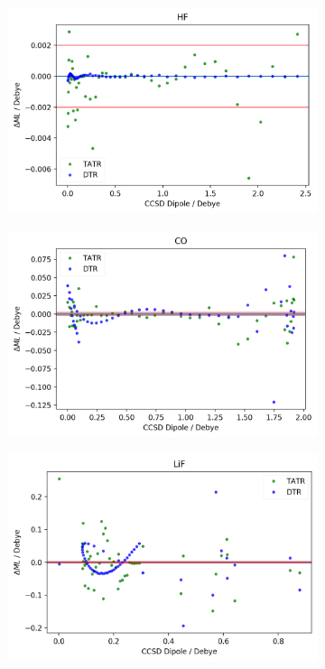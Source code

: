 \begin{figure}
    \begin{subfigure}{.5\textwidth}
        \centering
        \includegraphics[scale=.55]{p2/figures/si/HF_d.png}
        \caption{}
        \label{fig:HF}
    \end{subfigure}%
    \begin{subfigure}{.5\textwidth}
        \centering
        \includegraphics[scale=.55]{p2/figures/si/CO_d.png}
        \caption{}
        \label{fig:CO}
    \end{subfigure}
    \begin{subfigure}{.5\textwidth}
        \centering
        \includegraphics[scale=.55]{p2/figures/si/LiF_d.png}

\end{subfigure}
\end{figure}
